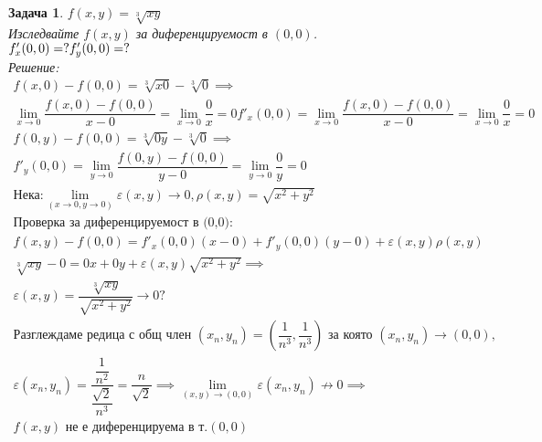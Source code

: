 \documentclass[a4paper,fleqn,12pt]{article}
\newtheorem{task}{Задача}[section]
\begin{document}
\begin{task}
$f(x,y) = \sqrt[3]{xy}$\\
Изследвайте $f(x,y)$ за диференцируемост в $(0,0)$.\\
$f'_x (0,0) = ?\\
f'_y (0,0) = ?$ \\
Решение: 
\begin{gather*}
f(x,0) - f(0,0) = \sqrt[3]{x0} - \sqrt[3]{0}\implies \\
\lim\limits_{x \to 0} \dfrac{f(x,0) - f(0,0)}{x - 0} = \lim\limits_{x \to 0} \dfrac{0}{x} = 0
f'_x(0,0) = \lim\limits_{x \to 0} \dfrac{f(x,0) - f(0,0)}{x - 0} =  \lim\limits_{x \to 0} \dfrac{0}{x} = 0\\
f(0,y) - f(0,0) = \sqrt[3]{0y} - \sqrt[3]{0} \implies \\
f'_y(0,0) = \lim\limits_{y \to 0} \dfrac{f(0,y) - f(0,0)}{y - 0} =  \lim\limits_{y \to 0} \dfrac{0}{y} = 0\\
\text{Нека:}
\lim\limits_ {(x \to 0, y \to 0)} \varepsilon (x,y) \to 0, \rho (x,y) = \sqrt{x^2 + y^2}\\
\text{Проверка за диференцируемост в (0,0):}\\
 f(x,y) - f(0,0)  = f'_x(0,0)(x - 0) + f'_y(0,0)(y-0) + \varepsilon (x,y) \rho (x,y) \\
\sqrt[3]{xy} - 0 = 0x + 0y + \varepsilon (x,y)\sqrt{x^2 + y^2} \implies \\
\varepsilon (x,y) = \dfrac{\sqrt[3]{xy}}{\sqrt{x^2 + y^2}} \to 0? \\
\text{Разглеждаме редица с общ член } (x_n, y_n) = \left( \dfrac{1}{n^3}, \dfrac{1}{n^3} \right) \text{ за която } (x_n, y_n) \to (0,0), \\
\varepsilon (x_n, y_n) = \dfrac{\dfrac{1}{n^2}}{\dfrac{\sqrt{2}}{n^3}} = \dfrac{n}{\sqrt{2}} \implies
\lim\limits_ {(x,y) \to (0,0)}\varepsilon(x_n, y_n) \not\to 0 \implies \\
 f(x,y) \text{ не е диференцируема в т.} (0,0)
\end{gather*}
\end{task}
\end{document}
